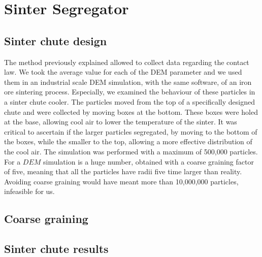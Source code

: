 
\chapter{Sinter Segregator}
\label{cap:sintersegregator}

\section{Sinter chute design}
\label{sec:sinterchutedesign}

The method previously explained allowed to collect data regarding the contact
law. We took the average value for each of the DEM parameter and we used them 
in an industrial scale DEM simulation, with the same software, 
of an iron ore sintering process. 
Especially, we examined the behaviour of these particles in a sinter chute cooler. 
The particles moved from the top of a specifically designed chute and were 
collected by moving boxes at the bottom. These boxes were holed at the base, 
allowing cool air to lower the temperature of the sinter. 
It was critical to ascertain if the larger particles segregated, 
by moving to the bottom of the boxes, while the smaller to the top, allowing a 
more effective distribution of the cool air. The simulation was performed 
with a maximum of 500,000 particles.
For a $DEM$ simulation is a huge number, obtained with a coarse graining factor
of five, meaning that all the particles have radii five time larger than reality.
Avoiding coarse graining would have meant more than 10,000,000 particles,
infeasible for us.

\section{Coarse graining}
\label{sec:coarsegraining}

\section{Sinter chute results}
\label{sec:sinterchuteresults}

